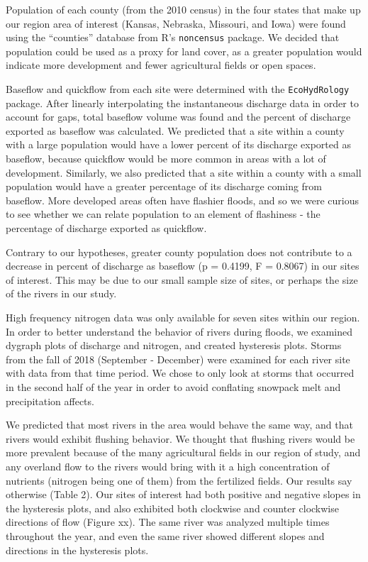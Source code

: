 \documentclass[12pt,]{article}
\begin{document}
Population of each county (from the 2010 census) in the four states that
make up our region area of interest (Kansas, Nebraska, Missouri, and
Iowa) were found using the ``counties'' database from R's
\texttt{noncensus} package. We decided that population could be used as
a proxy for land cover, as a greater population would indicate more
development and fewer agricultural fields or open spaces.

Baseflow and quickflow from each site were determined with the
\texttt{EcoHydRology} package. After linearly interpolating the
instantaneous discharge data in order to account for gaps, total
baseflow volume was found and the percent of discharge exported as
baseflow was calculated. We predicted that a site within a county with a
large population would have a lower percent of its discharge exported as
baseflow, because quickflow would be more common in areas with a lot of
development. Similarly, we also predicted that a site within a county
with a small population would have a greater percentage of its discharge
coming from baseflow. More developed areas often have flashier floods,
and so we were curious to see whether we can relate population to an
element of flashiness - the percentage of discharge exported as
quickflow.

Contrary to our hypotheses, greater county population does not
contribute to a decrease in percent of discharge as baseflow (p =
0.4199, F = 0.8067) in our sites of interest. This may be due to our
small sample size of sites, or perhaps the size of the rivers in our
study.

High frequency nitrogen data was only available for seven sites within
our region. In order to better understand the behavior of rivers during
floods, we examined dygraph plots of discharge and nitrogen, and created
hysteresis plots. Storms from the fall of 2018 (September - December)
were examined for each river site with data from that time period. We
chose to only look at storms that occurred in the second half of the
year in order to avoid conflating snowpack melt and precipitation
affects.

We predicted that most rivers in the area would behave the same way, and
that rivers would exhibit flushing behavior. We thought that flushing
rivers would be more prevalent because of the many agricultural fields
in our region of study, and any overland flow to the rivers would bring
with it a high concentration of nutrients (nitrogen being one of them)
from the fertilized fields. Our results say otherwise (Table 2). Our
sites of interest had both positive and negative slopes in the
hysteresis plots, and also exhibited both clockwise and counter
clockwise directions of flow (Figure xx). The same river was analyzed
multiple times throughout the year, and even the same river showed
different slopes and directions in the hysteresis plots.
\end{document}
